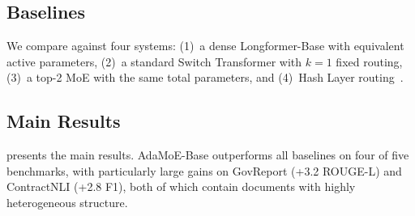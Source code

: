 \documentclass[11pt,a4paper]{article}
\begin{document}
\subsection{Baselines}

We compare against four systems: (1)~a dense Longformer-Base with equivalent active
parameters, (2)~a standard Switch Transformer with $k=1$ fixed routing,
(3)~a top-2 MoE with the same total parameters, and (4)~Hash Layer
routing~\cite{roller2021hash}.

\subsection{Main Results}

 presents the main results.
AdaMoE-Base outperforms all baselines on four of five benchmarks, with particularly large
gains on GovReport (+3.2 ROUGE-L) and ContractNLI (+2.8 F1), both of which contain
documents with highly heterogeneous structure.

\begin{table}[t]
\centering
\caption{Main results across five long-document benchmarks. We report ROUGE-L for
summarization, accuracy for QuALITY, F1 for NarrativeQA and ContractNLI.
Best results in \textbf{bold}, second best \underline{underlined}.
$^\dagger$Active parameters per forward pass.}
\label{tab:main_results}
\end{table}
\end{document}
